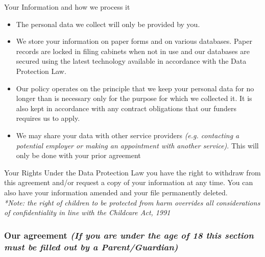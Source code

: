 \documentclass[a4paper,10pt]{article}
\begin{document}
\begin{mybox}{Your Information and how we process it}
\begin{small}
\begin{itemize}
    \item The personal data we collect will only be provided by you. 
    \item We store your information on paper forms and on various databases. Paper records are locked in filing cabinets when not in use and our databases are secured using the latest technology available in accordance with the Data Protection Law. 
    \item Our policy operates on the principle that we keep your personal data for no longer than is necessary only for the purpose for which we collected it.  It is also kept in accordance with any contract obligations that our funders requires us to apply. 
\item We may share your data with other service providers \textit{(e.g. contacting a potential employer or making an appointment with another service)}.  This will only be done with your prior agreement

\end{itemize}
\end{small}
\end{mybox}


\begin{mybox}{Your Rights}
{\small Under the Data Protection Law you have the right to withdraw from this agreement and/or request a copy of your information at any time.  You can also have your information amended and your file permanently deleted. } \\
\textit{{\footnotesize **Note: the right of children to be protected from harm overrides all considerations of confidentiality in line with the Childcare Act, 1991}} 
\end{mybox}

\subsubsection*{Our agreement \textit{{\footnotesize (If you are under the age of 18 this section must be filled out by a Parent/Guardian)}} }
\end{document}
